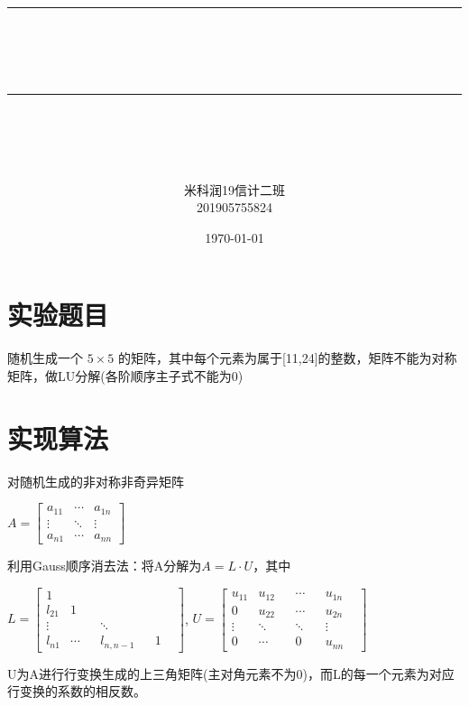 \documentclass[12pt]{article} %
\newcommand{\horrule}[1]{\rule[0.5ex]{\linewidth}{#1}} 	%
\begin{document}
	
	\title{
		\horrule{0.5pt}\\
		\horrule{1.8pt}\\[20pt]
	}
	\author{米科润\quad 19信计二班\\201905755824}
	\date{\today} %
	
	\begin{titlepage}
		\maketitle
		\vspace{30pt}
		\thispagestyle{empty}
	\end{titlepage}
	
	\tableofcontents
	\thispagestyle{empty}
	
	\newpage
	\setcounter{page}{1}
	
	\section{实验题目}
	随机生成一个 $5\times5$ 的矩阵，其中每个元素为属于[11,24]的整数，矩阵不能为对称矩阵，做LU分解(各阶顺序主子式不能为0)
	
	
	\section{实现算法}
	对随机生成的非对称非奇异矩阵
	\begin{center}
	$A=
	\begin{bmatrix}
		a_{11} &\cdots& a_{1n} \\
		\vdots &\ddots& \vdots \\
		a_{n1} &\cdots& a_{nn}
	\end{bmatrix}$
	\end{center}
	\indent 利用Gauss顺序消去法：将A分解为$A=L\cdot U$，其中
	\begin{center}
	$L=
	\begin{bmatrix}
		1  \\
		l_{21}   &1& \\
		\vdots  &&  &\ddots& \\
		l_{n1} &\cdots& &l_{n,n-1}& &1&
	\end{bmatrix}$,
	$U=
	\begin{bmatrix}
		u_{11} &u_{12}& &\cdots& &u_{1n}& \\
		0 &u_{22}& &\cdots& &u_{2n}& \\
		\vdots &\ddots& &\ddots& &\vdots& \\
		0 &\cdots& &0& &u_{nn}&
	\end{bmatrix}$
	\end{center}
	\indent U为A进行行变换生成的上三角矩阵(主对角元素不为0)，而L的每一个元素为对应行变换的系数的相反数。
	
\end{document}
